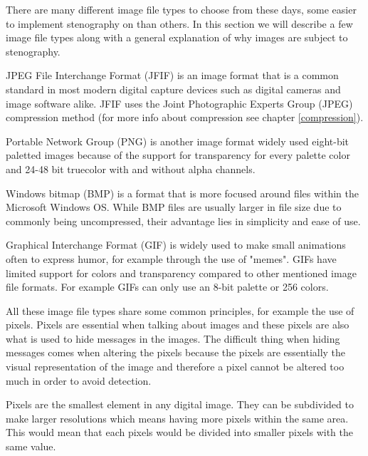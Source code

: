 There are many different image file types to choose from these days, some easier to implement stenography on than others. In this section we will describe a few image file types along with a general explanation of why images are subject to stenography.

JPEG File Interchange Format (JFIF) is an image format that is a common standard in most modern digital capture devices such as digital cameras and image software alike. JFIF uses the Joint Photographic Experts Group (JPEG) compression method (for more info about compression see chapter \ref{compression}).

Portable Network Group (PNG) is another image format widely used eight-bit paletted images because of the support for transparency for every palette color and 24-48 bit truecolor with and without alpha channels.

Windows bitmap (BMP) is a format that is more focused around files within the Microsoft Windows OS. While BMP files are usually larger in file size due to commonly being uncompressed, their advantage lies in simplicity and ease of use.

Graphical Interchange Format (GIF) is widely used to make small animations often to express humor, for example through the use of "memes". GIFs have limited support for colors and transparency compared to other mentioned image file formats. For example GIFs can only use an 8-bit palette or 256 colors.

All these image file types share some common principles, for example the use of pixels. Pixels are essential when talking about images and these pixels are also what is used to hide messages in the images. The difficult thing when hiding messages comes when altering the pixels because the pixels are essentially the visual representation of the image and therefore a pixel cannot be altered too much in order to avoid detection.

Pixels are the smallest element in any digital image. They can be subdivided to make larger resolutions which means having more pixels within the same area. This would mean that each pixels would be divided into smaller pixels with the same value.\cite{ThePixel}